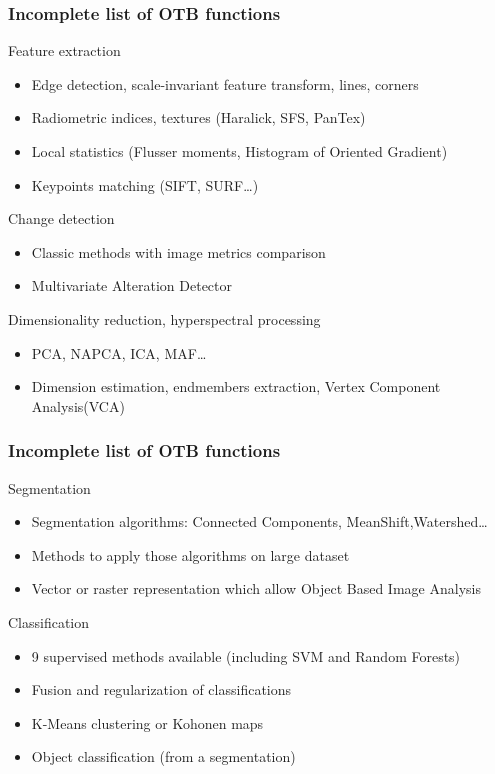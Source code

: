 \documentclass[smaller]{beamer}
\begin{document}
\begin{frame}
\frametitle{Incomplete list of OTB functions}

\begin{block}{Feature extraction}
\begin{itemize}
\item Edge detection, scale-invariant feature transform, lines, corners
\item Radiometric indices, textures (Haralick, SFS, PanTex)
\item Local statistics (Flusser moments, Histogram of Oriented Gradient)
\item Keypoints matching (SIFT, SURF\ldots)
\end{itemize}
\end{block}

\begin{block}{Change detection}
\begin{itemize}
\item Classic methods with image metrics comparison
\item Multivariate Alteration Detector
\end{itemize}
\end{block}

\begin{block}{Dimensionality reduction, hyperspectral processing}
\begin{itemize}
\item PCA, NAPCA, ICA, MAF\ldots
\item Dimension estimation, endmembers extraction, Vertex Component Analysis(VCA)
\end{itemize}
\end{block}

\end{frame}

\begin{frame}
\frametitle{Incomplete list of OTB functions}
\begin{block}{Segmentation}
\begin{itemize}
\item Segmentation algorithms: Connected Components, MeanShift,Watershed\ldots
\item Methods to apply those algorithms on large dataset
\item Vector or raster representation which allow Object Based Image Analysis
\end{itemize}
\end{block}

\begin{block}{Classification}
\begin{itemize}
\item 9 supervised methods available (including SVM and Random Forests)
\item Fusion and regularization of classifications
\item K-Means clustering or Kohonen maps
\item Object classification (from a segmentation)
\end{itemize}
\end{block}

\end{frame}
\end{document}
